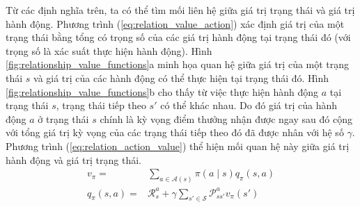 Từ các định nghĩa trên, ta có thể tìm mối liên hệ giữa giá trị trạng thái và giá trị hành động.
Phương trình (\ref{eq:relation_value_action}) xác định giá trị của một trạng thái bằng tổng có trọng số của các giá trị hành động tại trạng thái đó (với trọng số là xác suất thực hiện hành động). 
Hình \ref{fig:relationship_value_functions}a minh họa quan hệ giữa giá trị của một trạng thái $s$ và giá trị của các hành động có thể thực hiện tại trạng thái đó. 
Hình \ref{fig:relationship_value_functions}b cho thấy từ việc thực hiện hành động $a$ tại trạng thái $s$, trạng thái tiếp theo $s'$ có thể khác nhau. 
Do đó giá trị của hành động $a$ ở trạng thái $s$ chính là kỳ vọng điểm thưởng nhận được ngay sau đó cộng với tổng giá trị kỳ vọng của các trạng thái tiếp theo đó đã được nhân với hệ số $\gamma$. 
Phương trình (\ref{eq:relation_action_value}) thể hiện mối quan hệ này giữa giá trị hành động và giá trị trạng thái.
\begin{align}
v_{\pi} = {} & \sum_{a \in \mathcal{A}(s)}^{}\pi(a \mid s)q_{\pi}(s,a) \label{eq:relation_value_action}\\
q_{\pi}(s,a) = {} & \mathcal{R}_{s}^{a} + \gamma \sum_{s' \in \mathcal{S}}^{}\mathcal{P}_{ss'}^{a}v_{\pi}(s') \label{eq:relation_action_value}
\end{align}
